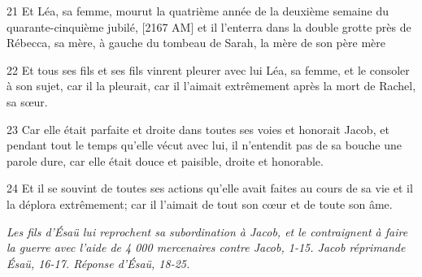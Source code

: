 \par 21 Et Léa, sa femme, mourut la quatrième année de la deuxième semaine du quarante-cinquième jubilé, [2167 AM] et il l'enterra dans la double grotte près de Rébecca, sa mère, à gauche du tombeau de Sarah, la mère de son père mère
\par 22 Et tous ses fils et ses fils vinrent pleurer avec lui Léa, sa femme, et le consoler à son sujet, car il la pleurait, car il l'aimait extrêmement après la mort de Rachel, sa sœur.
\par 23 Car elle était parfaite et droite dans toutes ses voies et honorait Jacob, et pendant tout le temps qu'elle vécut avec lui, il n'entendit pas de sa bouche une parole dure, car elle était douce et paisible, droite et honorable.
\par 24 Et il se souvint de toutes ses actions qu'elle avait faites au cours de sa vie et il la déplora extrêmement; car il l'aimait de tout son cœur et de toute son âme.


\par \textit{Les fils d'Ésaü lui reprochent sa subordination à Jacob, et le contraignent à faire la guerre avec l'aide de 4 000 mercenaires contre Jacob, 1-15. Jacob réprimande Ésaü, 16-17. Réponse d'Ésaü, 18-25.}

